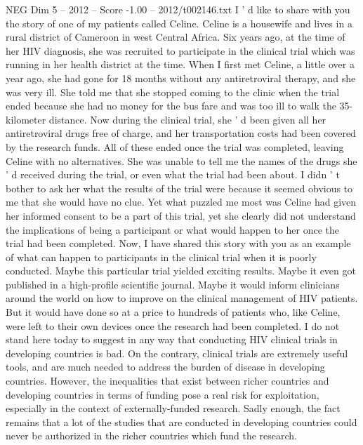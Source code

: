 \begin{textsample}{NEG Dim 5 – 2012 – Score -1.00 – 2012/t002146.txt}  \label{ex:f5_neg_044}
I ' d like to share with you the story of one of my patients called Celine.
Celine is a housewife and lives in a rural district of Cameroon in west Central Africa.
Six years ago, at the time of her HIV diagnosis, she was recruited to participate in the clinical trial which was running in her health district at the time.
When I first met Celine, a little over a year ago, she had gone for 18 months without any antiretroviral therapy, and she was very ill.
She told me that she stopped coming to the clinic when the trial ended because she had no money for the bus fare and was too ill to walk the 35-kilometer distance.
Now during the clinical trial, she ' d been given all her antiretroviral drugs free of charge, and her transportation costs had been covered by the research funds.
All of these ended once the trial was completed, leaving Celine with no alternatives.
She was unable to tell me the names of the drugs she ' d received during the trial, or even what the trial had been about.
I didn ' t bother to ask her what the results of the trial were because it seemed obvious to me that she would have no clue.
Yet what puzzled me most was Celine had given her informed consent to be a part of this trial, yet she clearly did not understand the implications of being a participant or what would happen to her once the trial had been completed.
Now, I have shared this story with you as an example of what can happen to participants in the clinical trial when it is poorly conducted.
Maybe this particular trial yielded exciting results.
Maybe it even got published in a high-profile scientific journal.
Maybe it would inform clinicians around the world on how to improve on the clinical management of HIV patients.
But it would have done so at a price to hundreds of patients who, like Celine, were left to their own devices once the research had been completed.
I do not stand here today to suggest in any way that conducting HIV clinical trials in developing countries is bad.
On the contrary, clinical trials are extremely useful tools, and are much needed to address the burden of disease in developing countries.
However, the inequalities that exist between richer countries and developing countries in terms of funding pose a real risk for exploitation, especially in the context of externally-funded research.
Sadly enough, the fact remains that a lot of the studies that are conducted in developing countries could never be authorized in the richer countries which fund the research.

\end{textsample}
